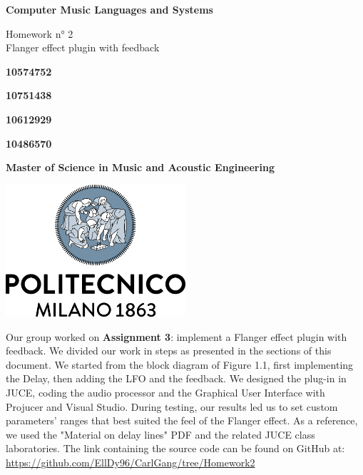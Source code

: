 \documentclass[a4paper,12pt]{report}
\begin{document}
\begin{titlepage}
\begin{center}
    \vspace*{1cm}
    
    \Huge
    \textbf{Computer Music Languages and Systems}
    
    \vspace{0.5cm}
    \LARGE
    Homework n° 2\\
   	Flanger effect plugin with feedback

    \vspace{1 cm}
    
    \textbf{10574752}
    
    \vspace{0.5cm}
    
    \textbf{10751438}
     
    \vspace{0.5cm}
    
    \textbf{10612929}
     
    
    \vspace{0.5cm}
    
    \textbf{10486570}
    
    \vspace{0.5cm}
    
    \vfill
  
   
    \date{May 2021}
    \vspace{0.3cm}
    \textbf{Master of Science in Music and Acoustic Engineering}
    
    \vspace{0.8cm}
    
    \includegraphics[width=0.5\textwidth]{logo_positivo.png}
    
\end{center}
\end{titlepage}


\abstract{}
Our group worked on \textbf{Assignment 3}: implement a 			  	Flanger effect plugin with feedback. We divided our work in 		 	steps as presented in the sections of this document.  We started from the block diagram of Figure 1.1, first implementing the Delay, then adding the LFO and the feedback. We designed the plug-in in JUCE, coding the audio processor and the Graphical User Interface with Projucer and Visual Studio. During testing, our results led us to set custom parameters' ranges that best suited the feel of the Flanger effect. As a reference, we used  the "Material on delay lines" PDF and the related JUCE class laboratories.
The link containing the source code can be found on GitHub at: \url{https://github.com/EllDy96/CarlGang/tree/Homework2}
\endabstract{}
\end{document}
